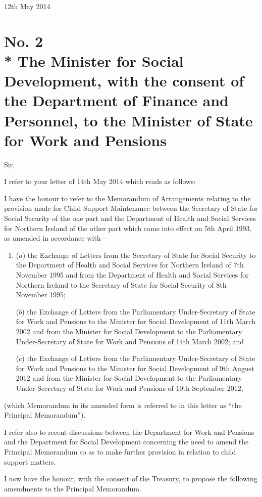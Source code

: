 \documentclass[12pt,a4paper]{article}
\begin{document}
12th May 2014

\section*{No. 2\\*
The Minister for Social Development, with the consent of the Department of Finance and Personnel, to the Minister of State for Work and Pensions}

Sir,

I refer to your letter of 14th May 2014 which reads as follows:

I have the honour to refer to the Memorandum of Arrangements relating to the provision 
made for Child Support Maintenance between the Secretary of State for Social Security of 
the one part and the Department of Health and Social Services for Northern Ireland of the 
other part which came into effect on 5th April 1993, as amended in accordance with---
\begin{enumerate}\item[] 
($a$) the Exchange of Letters from the Secretary of State for Social Security to the 
Department of Health and Social Services for Northern Ireland of 7th November 
1995 and from the Department of Health and Social Services for Northern Ireland 
to the Secretary of State for Social Security of 8th November 1995;

($b$) the Exchange of Letters from the Parliamentary Under-Secretary of State for Work
and Pensions to the Minister for Social Development of 11th March 2002 and from
the Minister for Social Development to the Parliamentary Under-Secretary of State
for Work and Pensions of 14th March 2002; and

($c$) the Exchange of Letters from the Parliamentary Under-Secretary of State for Work
and Pensions to the Minister for Social Development of 9th August 2012 and from
the Minister for Social Development to the Parliamentary Under-Secretary of State
for Work and Pensions of 10th September 2012,
\end{enumerate}
(which Memorandum in its amended form is referred to in this letter as ``the Principal
Memorandum'').

I refer also to recent discussions between the Department for Work and Pensions and the
Department for Social Development concerning the need to amend the Principal
Memorandum so as to make further provision in relation to child support matters.

I now have the honour, with the consent of the Treasury, to propose the following amendments to the Principal Memorandum.
\end{document}
